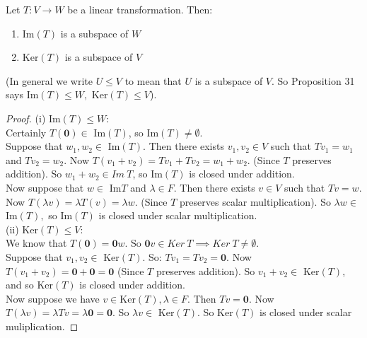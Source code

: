 \documentclass[twoside]{scrartcl}
\begin{document}
\begin{proposition} Let $T : V \to W$ be a linear transformation. Then:
\begin{enumerate}
\item Im$(T)$ is a subspace of $W$
\item Ker$(T)$ is a subspace of $V$
\end{enumerate}
\end{proposition}

(In general we write $U \leq V$ to mean that $U$ is a subspace of $V$. So Proposition 31 says Im$(T) \leq W, $ Ker$(T) \leq V$). 

\begin{proof}
(i) Im$(T) \leq W$: \\

Certainly $T(\mathbf{0}) \in $ Im$(T)$, so Im$(T) \neq \emptyset$.\\

Suppose that $w_1, w_2 \in $ Im$(T)$. Then there exists $v_1, v_2 \in V$ such that $Tv_1 = w_1$ and $Tv_2 = w_2$. Now $T(v_1 + v_2) = Tv_1 + Tv_2 = w_1 + w_2$. (Since $T$ preserves addition). So $w_1 + w_2 \in Im ~T$, so Im$(T)$ is closed under addition. \\

Now suppose that $w \in $ Im$T$ and $\lambda \in F$. Then there exists $v \in V$ such that $Tv = w$. Now $T(\lambda v) = \lambda T(v) = \lambda w$. (Since $T$ preserves scalar multiplication). So $\lambda w \in $ Im$(T),$ so Im$(T)$ is closed under scalar multiplication.\\

\noindent (ii) Ker$(T) \leq V$:\\

We know that $T(\mathbf{0}) = \mathbf{0}w.$ So $\mathbf{0}v \in Ker~ T \implies Ker~ T \neq \emptyset.$\\

Suppose that $v_1, v_2 \in $ Ker$(T)$. So: $Tv_1 = Tv_2 = \mathbf{0}.$ Now $T(v_1 + v_2) = \mathbf{0} + \mathbf{0} = \mathbf{0}$ (Since $T$ preserves addition). So $v_1 + v_2 \in $ Ker$(T)$, and so Ker$(T)$ is closed under addition.\\

Now suppose we have $v \in \text{Ker}(T), \lambda \in F.$ Then $Tv = \mathbf{0}.$ Now $T(\lambda v) = \lambda Tv = \lambda \mathbf{0} = \mathbf{0}.$ So $\lambda v \in $ Ker$(T).$ So Ker$(T)$ is closed under scalar muliplication. 
\end{proof}\vspace*{5pt}
\end{document}
